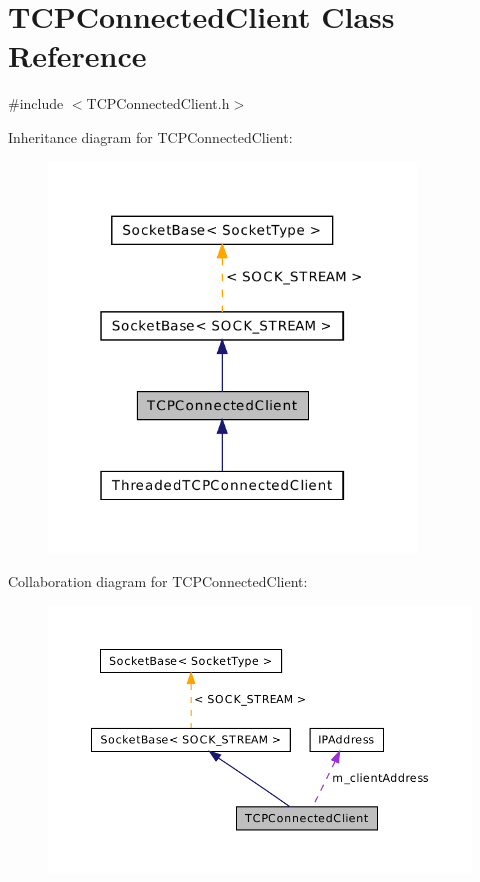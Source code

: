 \hypertarget{class_t_c_p_connected_client}{\section{T\-C\-P\-Connected\-Client Class Reference}
\label{class_t_c_p_connected_client}
}


{\ttfamily \#include $<$T\-C\-P\-Connected\-Client.\-h$>$}



Inheritance diagram for T\-C\-P\-Connected\-Client\-:\nopagebreak
\begin{figure}[H]
\begin{center}
\leavevmode
\includegraphics[width=277pt]{class_t_c_p_connected_client__inherit__graph}
\end{center}
\end{figure}


Collaboration diagram for T\-C\-P\-Connected\-Client\-:\nopagebreak
\begin{figure}[H]
\begin{center}
\leavevmode
\includegraphics[width=350pt]{class_t_c_p_connected_client__coll__graph}
\end{center}
\end{figure}

